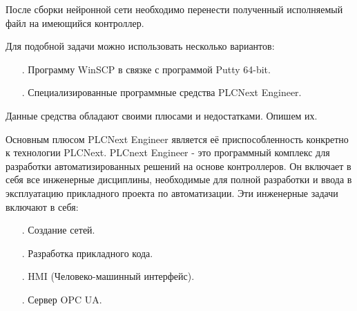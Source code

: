 {\gostFont

	\par \redline После сборки нейронной сети необходимо перенести полученный исполняемый файл на имеющийся контроллер.

	\par \redline Для подобной задачи можно использовать несколько вариантов:

	\begin{itemize}[leftmargin=2.15cm, labelwidth=0.65cm, labelsep=0.0cm] 

		\item[\theitemcntr. ]	Программу WinSCP в связке с программой Putty 64-bit. 
		\addtocounter{itemcntr}{1}

		\item[\theitemcntr. ] Специализированные программные средства PLCNext Engineer. 
		\addtocounter{itemcntr}{1}

	\end{itemize} \setcounter{itemcntr}{1}

	\par \redline Данные средства обладают своими плюсами и недостатками. Опишем их. 

	\par \redline Основным плюсом PLCNext Engineer является её приспособленность конкретно к технологии PLCNext. PLCnext Engineer - это программный комплекс для разработки автоматизированных решений на основе контроллеров. Он включает в себя все инженерные дисциплины, необходимые для полной разработки и ввода в эксплуатацию прикладного проекта по автоматизации. Эти инженерные задачи включают в себя:

	\begin{itemize}[leftmargin=2.15cm, labelwidth=0.65cm, labelsep=0.0cm] 

		\item[\theitemcntr. ] Создание сетей.
		\addtocounter{itemcntr}{1}

		\item[\theitemcntr. ] Разработка прикладного кода.
		\addtocounter{itemcntr}{1}
		
		\item[\theitemcntr. ] HMI (Человеко-машинный интерфейс).
		\addtocounter{itemcntr}{1}

		\item[\theitemcntr. ] Сервер OPC UA.
		\addtocounter{itemcntr}{1}

	\end{itemize} \setcounter{itemcntr}{1}

}
